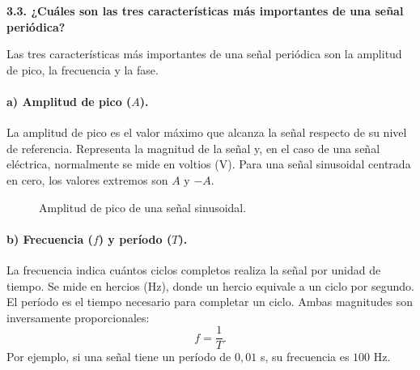 \documentclass[11pt,a4paper]{article}
\begin{document}
\vspace{0.3cm}
\noindent\textbf{3.3. ¿Cuáles son las tres características más importantes de una señal periódica?}\par
\noindent Las tres características más importantes de una señal periódica son la amplitud de pico, la frecuencia y la fase.

\paragraph{a) Amplitud de pico (\(A\)).}
La amplitud de pico es el valor máximo que alcanza la señal respecto de su nivel de referencia. Representa la magnitud de la señal y, en el caso de una señal eléctrica, normalmente se mide en voltios (V). Para una señal sinusoidal centrada en cero, los valores extremos son \(A\) y \(-A\).

\begin{figure}[htbp]
\centering
{}
\caption{Amplitud de pico de una señal sinusoidal.}
\end{figure}

\paragraph{b) Frecuencia (\(f\)) y período (\(T\)).}
La frecuencia indica cuántos ciclos completos realiza la señal por unidad de tiempo. Se mide en hercios (Hz), donde un hercio equivale a un ciclo por segundo. El período es el tiempo necesario para completar un ciclo. Ambas magnitudes son inversamente proporcionales:
\[
f=\frac{1}{T}.
\]
Por ejemplo, si una señal tiene un período de \(0{,}01\) s, su frecuencia es \(100\) Hz.
\end{document}
